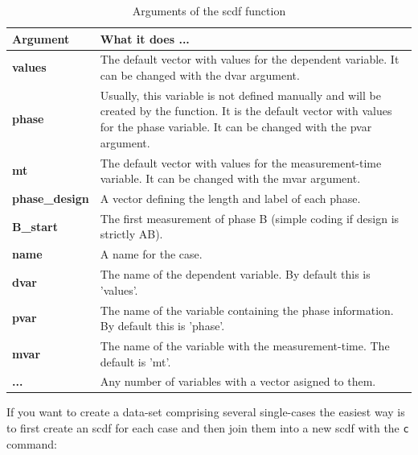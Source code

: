 \documentclass[
]{book}
\begin{document}
\begin{table}

\caption{\label{tab:table-scdf}Arguments of the scdf function}
\begin{tabular}[t]{>{\raggedright\arraybackslash}p{15em}>{\raggedright\arraybackslash}p{30em}}
\toprule
Argument & What it does ...\\
\midrule
\textbf{values} & The default vector with values for the dependent variable. It can be changed with the dvar argument.\\
\textbf{phase} & Usually, this variable is not defined manually and will be created by the function. It is the default vector with values for the phase variable. It can be changed with the pvar argument.\\
\textbf{mt} & The default vector with values for the measurement-time variable. It can be changed with the mvar argument.\\
\textbf{phase\_design} & A vector defining the length and label of each phase.\\
\textbf{B\_start} & The first measurement of phase B (simple coding if design is strictly AB).\\
\textbf{name} & A name for the case.\\
\textbf{dvar} & The name of the dependent variable. By default this is 'values'.\\
\textbf{pvar} & The name of the variable containing the phase information. By default this is 'phase'.\\
\textbf{mvar} & The name of the variable with the measurement-time. The default is 'mt'.\\
\textbf{...} & Any number of variables with a vector asigned to them.\\
\bottomrule
\end{tabular}
\end{table}

If you want to create a data-set comprising several single-cases the easiest way is to first create an scdf for each case and then join them into a new scdf with the \texttt{c} command:
\end{document}

